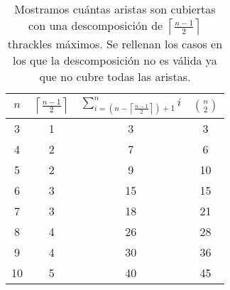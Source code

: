 \begin{table}[t]
  \centering
  \begin{tabular}{|c|c|c|c|}
    \hline
    $n$ & $\left\lceil\frac{n-1}{2}\right\rceil$ & $\sum^n_{i=\left(n-\left\lceil\frac{n-1}{2}\right\rceil\right) + 1}i$ & $\binom{n}{2}$\\[5pt] \hline\hline
    3   & 1  & 3 & 3 \\ \hline
    4   & 2  & 7 & 6 \\ \hline
    5   & 2  & \cellcolor{red!25}9 & 10 \\ \hline
    6   & 3  & 15 & 15 \\ \hline
    7   & 3  & \cellcolor{red!25}18 & 21 \\ \hline
    8   & 4  & \cellcolor{red!25}26 & 28 \\ \hline
    9   & 4  & \cellcolor{red!25}30 & 36 \\ \hline
    10  & 5  & \cellcolor{red!25}40 & 45 \\ \hline
  \end{tabular}
  \caption{ Mostramos cuántas aristas son cubiertas con una descomposición de $\left\lceil\frac{n-1}{2}\right\rceil$  thrackles
  máximos. Se rellenan los casos en los que la descomposición no es válida ya que no cubre todas las aristas. }
  \label{table:attrivialtight}
\end{table}
%
%




